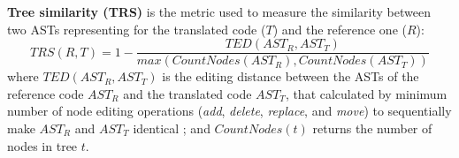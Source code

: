 \textbf{Tree similarity (TRS)} is the metric used to measure 
the similarity between two ASTs representing for the translated code ($T$)
and the reference one ($R$):
$$TRS(R, T) = 1 -\frac{TED(AST_R, AST_T)}{max\left(CountNodes(AST_R), CountNodes(AST_T)\right)}$$  
where $TED(AST_R, AST_T)$ is the editing distance between the ASTs 
of the reference code $AST_R$ and the translated code $AST_T$, that calculated by 
minimum number of node editing operations ({\em add}, {\em delete}, {\em replace}, 
and {\em move}) to sequentially make $AST_R$ and $AST_T$ identical \cite{oopsla10}; and 
$CountNodes(t)$ returns the number of nodes in tree $t$.
%
%
%

%

